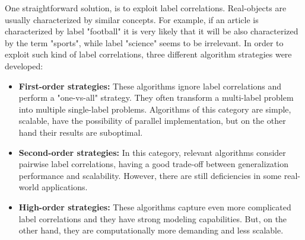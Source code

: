 \documentclass[12pt]{report}
\begin{document}
	One straightforward solution, is to exploit label correlations. Real-objects are usually characterized by similar concepts. For example, if an article is characterized by label "football" it is very likely that it will be also characterized by the term "sports", while label "science" seems to be irrelevant. In order to exploit such kind of label correlations, three different algorithm strategies were developed:
	
	\begin{itemize}
		\item \textbf{First-order strategies: }These algorithms ignore label correlations and perform a "one-vs-all" strategy. They often transform a multi-label problem into multiple single-label problems. Algorithms of this category are simple, scalable, have the possibility of parallel implementation, but on the other hand their results are suboptimal.
		\item \textbf{Second-order strategies: }In this category, relevant algorithms consider pairwise label correlations, having a good trade-off between generalization performance and scalability. However, there are still deficiencies in some real-world applications.
		\item \textbf{High-order strategies: }These algorithms capture even more complicated label correlations and they have strong modeling capabilities. But, on the other hand, they are computationally more demanding and less scalable.
	\end{itemize}
	
\end{document}
